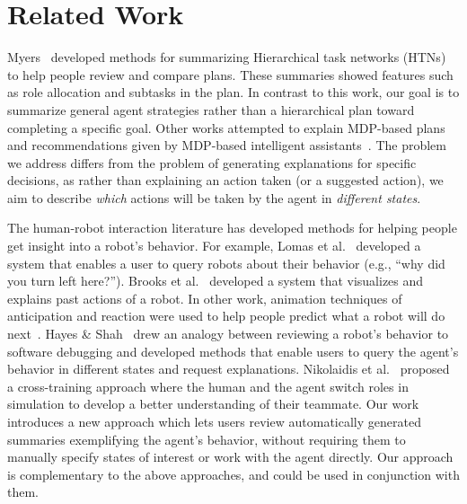 \section{Related Work}
\label{sec:related}
Myers~\citep{myers2006metatheoretic} developed methods for summarizing Hierarchical task networks (HTNs) to help people review and compare plans. These summaries showed features such as role allocation and subtasks in the plan. In contrast to this work, our goal is to summarize general agent strategies rather than a hierarchical plan toward completing a specific goal. Other works attempted to explain MDP-based plans~\cite{seegebarth2012making} and recommendations given by MDP-based intelligent assistants~\cite{khan2009minimal,khan2011automatically,dodson2011natural}. The problem we address differs from the problem of generating explanations for specific decisions, as rather than explaining an action taken (or a suggested action), we aim to describe \emph{which} actions will be taken by the agent in \emph{different states}. 

The human-robot interaction literature has developed methods for helping people get insight into a robot's behavior. For example, Lomas et al.~\cite{lomas2012explaining} developed a system that enables a user to query robots about their behavior (e.g., ``why did you turn left here?''). Brooks et al.~\cite{brooks2010towards} developed a system that visualizes and explains past actions of a robot. In other work, animation techniques of anticipation and reaction were used to help people predict what a robot will do next~\cite{takayama2011expressing}. Hayes \& Shah~\cite{hayes2017improving} 
drew an analogy between reviewing a robot's behavior to software debugging and developed methods that enable users to query the agent's behavior in different states and request explanations. 
Nikolaidis et al.~\cite{nikolaidis2013human} proposed a cross-training approach where the human and the agent switch roles in simulation to develop a better understanding of their teammate.
Our work introduces a new approach which lets users review automatically generated summaries exemplifying the agent's behavior, without requiring them to manually specify states of interest or work with the agent directly. Our approach is complementary to the above approaches, and could be used in conjunction with them.

